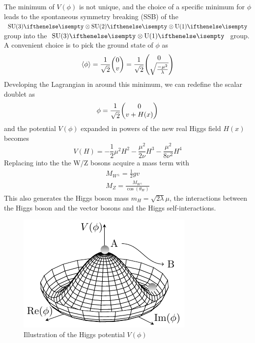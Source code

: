 The minimum of $V(\phi)$ is not unique, and the choice of a specific minimum for $\phi$ leads to the spontaneous symmetry breaking (SSB) of the $\SU{3} \otimes \SU{2} \otimes \U{1}$ group into the $\SU{3} \otimes \U{1}$ group.\\
A convenient choice is to pick the ground state of $\phi$ as
\begin{equation}
    \langle\phi\rangle=\frac{1}{\sqrt{2}}\db{0}{v}=\frac{1}{\sqrt{2}}\db{0}{\sqrt{\frac{-\mu^2}{\lambda}}}
\end{equation}
Developing the Lagrangian in  around this minimum, we can redefine the scalar doublet as
\begin{equation}\label{eq:higgs_intro}
    \phi=\frac{1}{\sqrt{2}}\db{0}{v+H(x)}
\end{equation}
and the potential $V(\phi)$ expanded in powers of the new real Higgs field $H(x)$ becomes
\begin{equation}
    V(H)=-\frac{1}{2}\mu^{2}H^{2}-\frac{\mu^{2}}{2\nu}H^{3}-\frac{\mu^{2}}{8\nu^{2}}H^{4}
\end{equation}
Replacing  into the  the W/Z bosons acquire a mass term with
\begin{gather}
    M_{W^\pm}=\frac{1}{2}gv\\
    M_Z=\frac{M_{W^\pm}}{\cos (\theta_W)}
\end{gather}
This also generates the Higgs boson mass $m_H=\sqrt{2\lambda}\mu$, the interactions between the Higgs boson and the vector bosons and the Higgs self-interactions.
\begin{figure}[h!]
    \centering
    \includegraphics[width=0.7\linewidth]{fig/chap02-theory/higgs.pdf}
    \caption{Illustration of the Higgs potential $V(\phi)$ \cite{HiggsTikZ.net}}
    \label{fig:HiggsPotential}
\end{figure}\\
